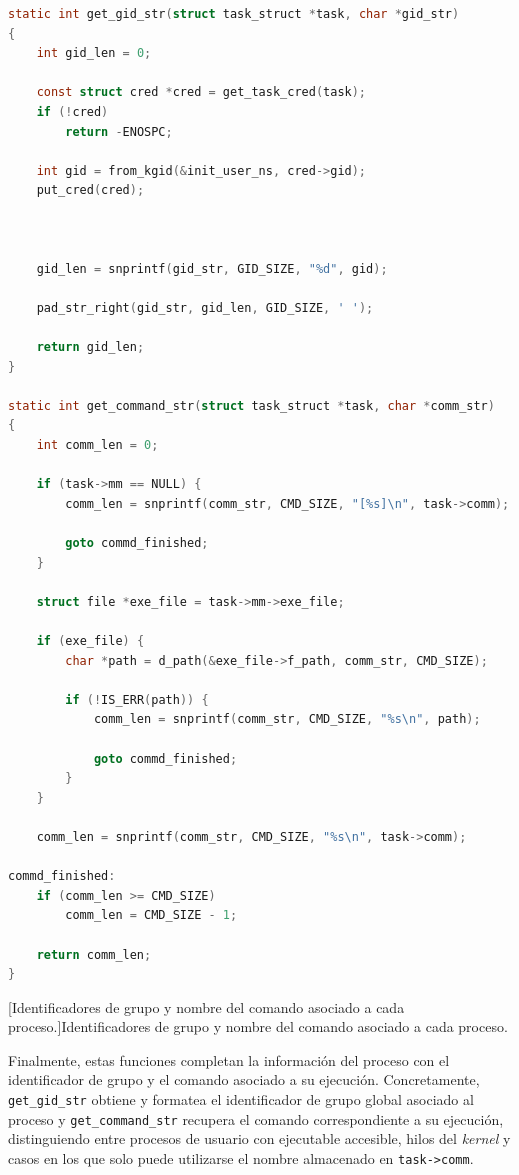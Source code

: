 \begin{lstlisting}[language=C]
static int get_gid_str(struct task_struct *task, char *gid_str)
{
	int gid_len = 0;

	const struct cred *cred = get_task_cred(task);
	if (!cred)
		return -ENOSPC;

	int gid = from_kgid(&init_user_ns, cred->gid);
	put_cred(cred);



	gid_len = snprintf(gid_str, GID_SIZE, "%d", gid);

	pad_str_right(gid_str, gid_len, GID_SIZE, ' ');

	return gid_len;
}

static int get_command_str(struct task_struct *task, char *comm_str)
{
	int comm_len = 0;

	if (task->mm == NULL) {
		comm_len = snprintf(comm_str, CMD_SIZE, "[%s]\n", task->comm);

		goto commd_finished;
	}

	struct file *exe_file = task->mm->exe_file;

	if (exe_file) {
		char *path = d_path(&exe_file->f_path, comm_str, CMD_SIZE);

		if (!IS_ERR(path)) {
			comm_len = snprintf(comm_str, CMD_SIZE, "%s\n", path);

			goto commd_finished;
		}
	}

	comm_len = snprintf(comm_str, CMD_SIZE, "%s\n", task->comm);

commd_finished:
	if (comm_len >= CMD_SIZE)
		comm_len = CMD_SIZE - 1;

	return comm_len;
}
\end{lstlisting}
\captionsetup{type=code,justification=centering,singlelinecheck=false}
[Identificadores de grupo y nombre del comando asociado a cada proceso.]{Identificadores de grupo y nombre del comando asociado a cada proceso.}
\label{cod:report_gid_command}
\vspace{\baselineskip}

Finalmente, estas funciones completan la información del proceso con el identificador de grupo y el comando asociado a su ejecución.
Concretamente, \verb|get_gid_str| obtiene y formatea el identificador de grupo global asociado al proceso y \verb|get_command_str| recupera el comando correspondiente a su ejecución, distinguiendo entre procesos de usuario con ejecutable accesible, hilos del \textit{kernel} y casos en los que solo puede utilizarse el nombre almacenado en \verb|task->comm|.\\

